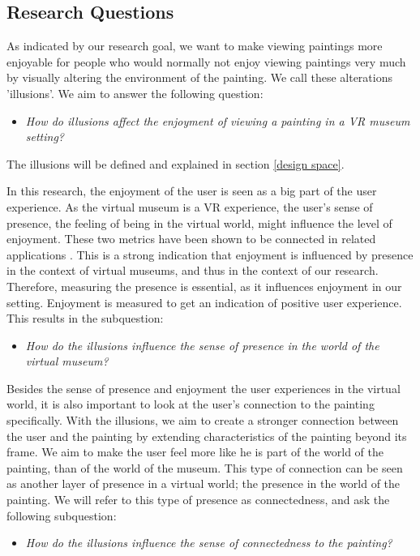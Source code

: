 \documentclass[a4paper]{article}
\begin{document}
\subsection {Research Questions}

As indicated by our research goal, we want to make viewing paintings more enjoyable for people who would normally not enjoy viewing paintings very much by visually altering the environment of the painting. We call these alterations 'illusions'. We aim to answer the following question:
\begin{itemize}
\item{\emph{How do illusions affect the enjoyment of viewing a painting in a VR museum setting?}}
\end{itemize}
The illusions will be defined and explained in section \ref{design space}. 

In this research, the enjoyment of the user is seen as a big part of the user experience. As the virtual museum is a VR experience, the user's sense of presence, the feeling of being in the virtual world, might influence the level of enjoyment. These two metrics have been shown to be connected in related applications \cite{sylaiou}. This is a strong indication that enjoyment is influenced by presence in the context of virtual museums, and thus in the context of our research. Therefore, measuring the presence is essential, as it influences enjoyment in our setting. Enjoyment is measured to get an indication of positive user experience. This results in the subquestion:

\begin{itemize}
\item{\emph{How do the illusions influence the sense of presence in the world of the virtual museum?}}
\end{itemize}

Besides the sense of presence and enjoyment the user experiences in the virtual world, it is also important to look at the user’s connection to the painting specifically. With the illusions, we aim to create a stronger connection between the user and the painting by extending characteristics of the painting beyond its frame. We aim to make the user feel more like he is part of the world of the painting, than of the world of the museum. This type of connection can be seen as another layer of presence in a virtual world; the presence in the world of the painting. We will refer to this type of presence as connectedness, and ask the following subquestion:

\begin{itemize}
\item{\emph{How do the illusions influence the sense of connectedness to the painting?}}
\end{itemize}
\end{document}
